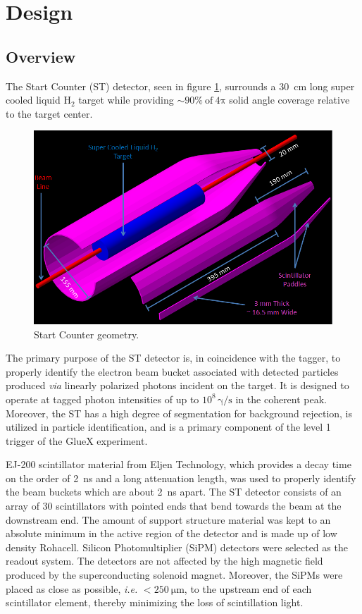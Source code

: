 \section{Design} \label{design}
\subsection{Overview}
The Start Counter (ST) detector, seen in figure \ref{fig:st-geo}, surrounds a 30~cm long super cooled liquid $\mathrm{H_{2}}$ target while providing $\sim 90 \%\ \mathrm{of\ 4 \pi}$ solid angle coverage relative to the target center.
\begin{figure}[!htb]
	\centering
	\includegraphics[width=1.0\columnwidth]{design/figs/30_Element_Pieces_Removed}
	\caption[Start Counter geometry]{Start Counter geometry.}
	\label{fig:st-geo}
\end{figure}
The primary purpose of the ST detector is, in coincidence with the tagger, to properly identify the electron beam bucket associated with detected particles produced \textit{via} linearly polarized photons incident on the target. It is designed to operate at tagged photon intensities of up to $10^{8}\,\mathrm{\gamma/s}$ in the coherent peak.  Moreover, the ST has a high degree of segmentation for background rejection, is utilized in particle identification, and is a primary component of the level 1 trigger of the GlueX experiment.

EJ-200 scintillator material from Eljen Technology, which provides a decay time on the order of 2~ns and a long attenuation length, was used to properly identify the beam buckets which are about 2~ns apart\cite{pooser16}.  The ST detector consists of an array of 30 scintillators with pointed ends that bend towards the beam at the downstream end. The amount of support structure material was kept to an absolute minimum in the active region of the detector and is made up of low density Rohacell\textregistered. Silicon Photomultiplier (SiPM) detectors were selected as the readout system. The detectors are not affected by the high magnetic field produced by the superconducting solenoid magnet. Moreover, the SiPMs were placed as close as possible, \textit{i.e.} $\mathrm{< 250\ \mu m}$, to the upstream end of each scintillator element, thereby minimizing the loss of scintillation light\cite{pooser16}.


